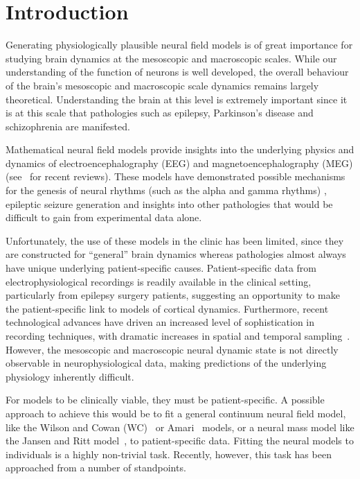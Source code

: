 \documentclass[12pt]{iopart}
\begin{document}
\maketitle

\section{Introduction}
Generating physiologically plausible neural field models is of great importance for studying brain dynamics at the mesoscopic and macroscopic scales. While our understanding of the function of neurons is well developed, the overall behaviour of the brain's mesoscopic and macroscopic scale dynamics remains largely theoretical. Understanding the brain at this level is extremely important since it is at this scale that pathologies such as epilepsy, Parkinson's disease and schizophrenia are manifested. 

Mathematical neural field models provide insights into the underlying physics and dynamics of electroencephalography (EEG) and magnetoencephalography (MEG) (see~\cite{Deco2008,David2003} for recent reviews). These models have demonstrated possible mechanisms for the genesis of neural rhythms (such as the alpha and gamma rhythms) \cite{Liley1999,RENNIE2000}, epileptic seizure generation \cite{DaSilva2003,Suffczynski2004,Wendling2005} and insights into other pathologies \cite{Moran2008,Schiff2009} that would be difficult to gain from experimental data alone. 

Unfortunately, the use of these models in the clinic has been limited, since they are constructed for ``general'' brain dynamics whereas pathologies almost always have unique underlying patient-specific causes. Patient-specific data from electrophysiological recordings is readily available in the clinical setting, particularly from epilepsy surgery patients, suggesting an opportunity to make the patient-specific link to models of cortical dynamics. Furthermore, recent technological advances have driven an increased level of sophistication in recording techniques, with dramatic increases in spatial and temporal sampling~\cite{Brinkmann2009}. However, the mesoscopic and macroscopic neural dynamic state is not directly observable in neurophysiological data, making predictions of the underlying physiology inherently difficult.

For models to be clinically viable, they must be patient-specific. A possible approach to achieve this would be to fit a general continuum neural field model, like the Wilson and Cowan (WC)~\cite{Wilson1973} or Amari~\cite{Amari1977} models, or a neural mass model like the Jansen and Ritt model~\cite{Jansen1995}, to patient-specific data. Fitting the neural models to individuals is a highly non-trivial task. Recently, however, this task has been approached from a number of standpoints.
\end{document}
